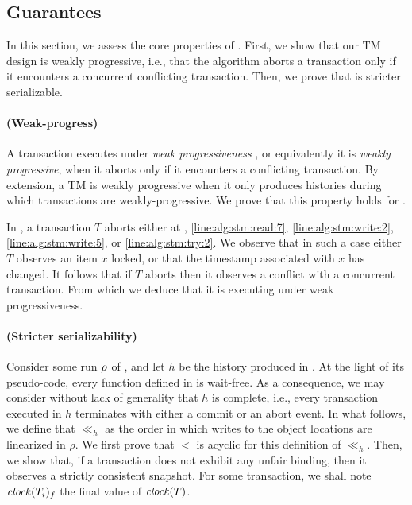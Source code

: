 \subsection{Guarantees}

In this section, we assess the core properties of .
First, we show that our TM design is weakly progressive, i.e., that the algorithm aborts a transaction only if it encounters a concurrent conflicting transaction.
Then, we prove that  is stricter serializable.

\paragraph{(Weak-progress)}
A transaction executes under \emph{weak progressiveness} \cite{Guerraoui:2009}, or equivalently it is \emph{weakly progressive}, when it aborts only if it encounters a conflicting transaction.
By extension, a TM is weakly progressive when it only produces histories during which transactions are weakly-progressive.
We prove that this property holds for .

In , a transaction $T$ aborts either at , \ref{line:alg:stm:read:7}, \ref{line:alg:stm:write:2}, \ref{line:alg:stm:write:5}, or \ref{line:alg:stm:try:2}.
We observe that in such a case either $T$ observes an item $x$ locked, or that the timestamp associated with $x$ has changed.
It follows that if $T$ aborts then it observes a conflict with a concurrent transaction.
From which we deduce that it is executing under weak progressiveness.

\paragraph{(Stricter serializability)}
Consider some run $\run$ of , and let $h$ be the history produced in \run.
At the light of its pseudo-code, every function defined in  is wait-free.
As a consequence, we may consider without lack of generality that $h$ is complete, i.e., every transaction executed in $h$ terminates with either a commit or an abort event.
In what follows, we define that $\ll_h$ as the order in which writes to the object locations are linearized in $\rho$.
We first prove that $<$ is acyclic for this definition of $\ll_h$.
Then, we show that, if a transaction does not exhibit any unfair binding, then it observes a strictly consistent snapshot.
For some transaction, we shall note $\clockOf{T_i}_f$ the final value of $\clockOf{T}$.

